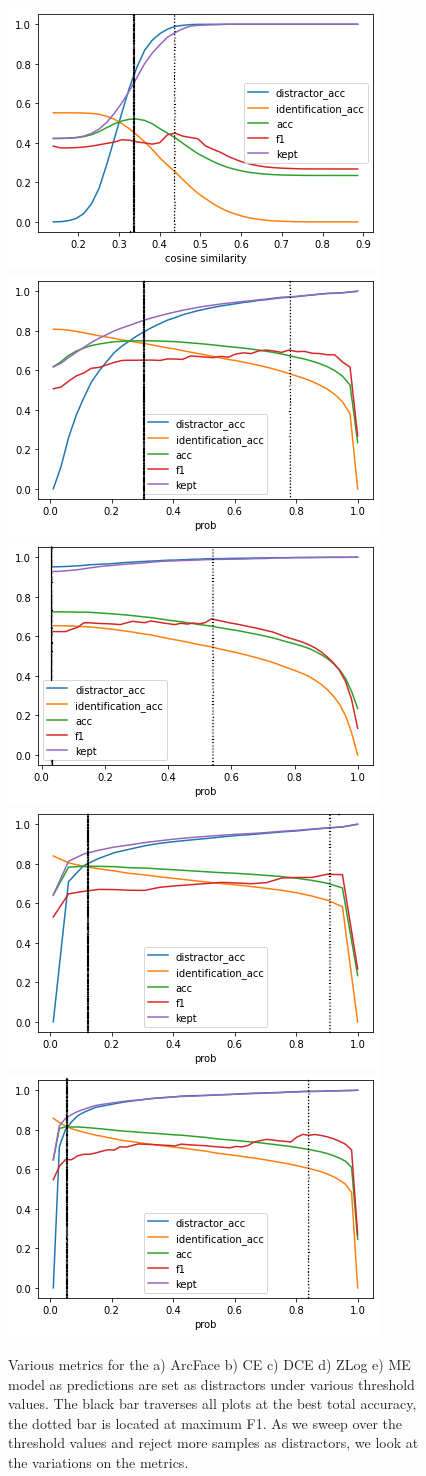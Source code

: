 \begin{figure}
    \centering
    \includegraphics[width=0.45\columnwidth]{50-files/arcface-all.png}
    \includegraphics[width=0.45\columnwidth]{50-files/ce-all.png}
    \includegraphics[width=0.45\columnwidth]{50-files/dce-all.png}
    \includegraphics[width=0.45\columnwidth]{50-files/zlog-all.png}
    \includegraphics[width=0.45\columnwidth]{50-files/me-all.png}
    \caption{Various metrics for the a) ArcFace b) CE c) DCE d) ZLog e) ME model as predictions are set as distractors under various threshold values. The black bar traverses all plots at the best total accuracy, the dotted bar is located at maximum F1. As we sweep over the threshold values and reject more samples as distractors, we look at the variations on the metrics.}
    \label{fig:fr-all-plots}
\end{figure}

